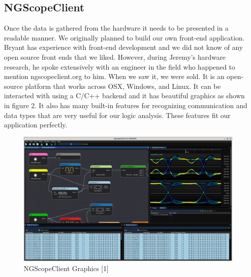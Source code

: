 \subsection{NGScopeClient}
	Once the data is gathered from the hardware it needs to be presented in a readable manner. We originally planned to build our own front-end application. Bryant has experience with front-end development and we did not know of any open source front ends that we liked. However, during Jeremy's hardware research, he spoke extensively with an engineer in the field who happened to mention ngscopeclient.org to him. When we saw it, we were sold. It is an open-source platform that works across OSX, Windows, and Linux. It can be interacted with using a C/C++ backend and it has beautiful graphics as shown in figure 2. It also has many built-in features for recognizing communication and data types that are very useful for our logic analysis. These features fit our application perfectly. 
	
		\begin{figure}[H]
		\centering
		\includegraphics[width=0.8\linewidth]{images/ngscopeclient-intro.png}
		\caption{NGScopeClient Graphics [1]}
		\label{fig:ngscope-client}
		\vspace{15px}
	\end{figure}
	

	‌
